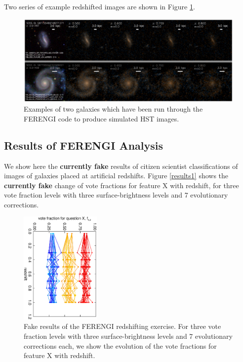 \documentclass[usenatbib]{mn2e}
\begin{document}
Two series of example redshifted images are shown in Figure \ref{exampleFERENGI}.

\begin{figure}
\includegraphics[width=160mm]{example_ferengi.ps}
\caption{Examples of two galaxies which have been run through the FERENGI code to produce simulated HST images. \label{exampleFERENGI}}
\end{figure}
 

\subsection{Results of FERENGI Analysis}

We show here the {\bf currently fake} results of citizen scientist classifications of images of galaxies placed at artificial redshifts. Figure \ref{results1} shows the {\bf currently fake} change of vote fractions for feature X with redshift, for three vote fraction levels with three surface-brightness levels and 7 evolutionary corrections. 

\begin{figure}
\begin{center}

\includegraphics[width=0.35\textwidth,angle=90]{fake_results.ps}

\caption{Fake results of the FERENGI redshifting exercise. For three vote fraction levels with three surface-brightness levels and 7 evolutionary corrections each, we show the evolution of the vote fractions for feature X with redshift.}

\label{fig:ferengi_results_fake}

\end{center}
\end{figure}
\end{document}
